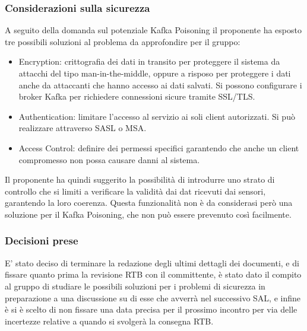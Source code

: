 \documentclass[10pt]{article}
\begin{document}
\subsubsection{Considerazioni sulla sicurezza}
A seguito della domanda sul potenziale Kafka Poisoning il proponente ha esposto tre possibili soluzioni al problema da approfondire per il gruppo:
\begin{itemize}
	\item Encryption: crittografia dei dati in transito per proteggere il sistema da attacchi del tipo man-in-the-middle, oppure a risposo
	per proteggere i dati anche da attaccanti che hanno accesso ai dati salvati. Si possono configurare i broker Kafka per richiedere connessioni
	sicure tramite SSL/TLS.
	\item Authentication: limitare l'accesso al servizio ai soli client autorizzati. Si può realizzare attraverso SASL o MSA. 
	\item Access Control: definire dei permessi specifici garantendo che anche un client compromesso non possa causare danni al sistema.
\end{itemize}
Il proponente ha quindi suggerito la possibilità di introdurre uno strato di controllo che si limiti a verificare la validità dai dat ricevuti
dai sensori, garantendo la loro coerenza. Questa funzionalità non è da considerasi però una soluzione per il Kafka Poisoning, che non può 
essere prevenuto così facilmente.

\subsubsection{Decisioni prese}
E' stato deciso di terminare la redazione degli ultimi dettagli dei documenti, e di fissare quanto prima la revisione RTB con il committente,
è stato dato il compito al gruppo di studiare le possibili soluzioni per i problemi di sicurezza in preparazione a una discussione su di esse
che avverrà nel successivo SAL, e infine è si è scelto di non fissare una data precisa per il prossimo incontro per via delle incertezze
relative a quando si svolgerà la consegna RTB.
\end{document}
